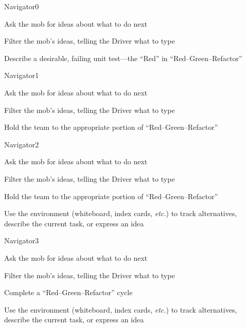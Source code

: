 \documentclass[letterpaper,20pt]{extarticle}
\begin{document}
\renewcommand{\blurb}{Listen and provide direction to the team}

\begin{role}{Navigator}{0}
  \item Ask the mob for ideas about what to do next
  \item Filter the mob's ideas, telling the Driver what to type
  \item Describe a desirable, failing unit test---the ``Red'' in ``Red--Green--Refactor''
\end{role}

\begin{role}{Navigator}{1}
  \item Ask the mob for ideas about what to do next
  \item Filter the mob's ideas, telling the Driver what to type
  \item Hold the team to the appropriate portion of ``Red--Green--Refactor''
\end{role}

\begin{role}{Navigator}{2}
  \item Ask the mob for ideas about what to do next
  \item Filter the mob's ideas, telling the Driver what to type
  \item Hold the team to the appropriate portion of ``Red--Green--Refactor''
  \item Use the environment (whiteboard, index cards, \textit{etc.}) to
    track alternatives, describe the current task, or express
    an idea
\end{role}

\begin{role}{Navigator}{3}
  \item Ask the mob for ideas about what to do next
  \item Filter the mob's ideas, telling the Driver what to type
  \item Complete a ``Red--Green--Refactor'' cycle
  \item Use the environment (whiteboard, index cards, \textit{etc.}) to
    track alternatives, describe the current task, or express
    an idea
\end{role}
\end{document}
